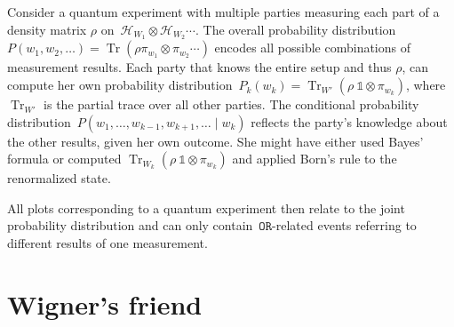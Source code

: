 \documentclass[aps,pra,12pt]{revtex4-2}
\renewcommand{\H}{\mathcal{H}}
\newcommand{\OR}{\mathtt{OR}}
\newcommand{\id}{\mathds{1}}
\DeclareMathOperator{\tr}{Tr}
\theoremstyle{definition}
\theoremstyle{remark}
\begin{document}
Consider a quantum experiment with multiple parties measuring each part of a density matrix $\rho$ on~$\H_{W_1}\otimes \H_{W_2} \cdots$. The overall probability distribution~$P(w_1,w_2,\ldots)=\tr(\rho \pi_{w_1}\otimes \pi_{w_2} \cdots) $ encodes all possible combinations of measurement results.
Each party that knows the entire setup and thus $\rho$, can compute her own probability distribution~$P_k(w_k)= \tr_{W'}(\rho \ \id\otimes \pi_{w_k})$, where $\tr_{W'}$ is the partial trace over all other parties. The conditional probability distribution~$P(w_1,\ldots, w_{k-1}, w_{k+1}, \ldots \mid w_k)$ reflects the party's knowledge about the other results, given her own outcome. She might have either used Bayes' formula or computed $\tr_{W_k}( \rho \ \id\otimes \pi_{w_k})$ and applied Born's rule to the renormalized state. 

All plots corresponding to a quantum experiment then relate to the joint probability distribution and can only contain~$\OR$-related events referring to different results of one measurement.
 \section{Wigner's friend}
\label{sec:Wigner}
\end{document}
